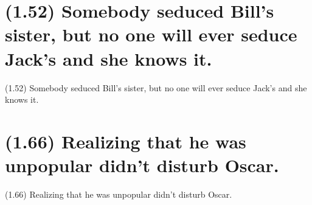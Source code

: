 \documentclass{article}
\begin{document}
\clearpage

%
%

\section*{(1.52) Somebody seduced Bill's sister, but no one will ever seduce Jack’s and she knows it.}

\bigbreak
\begin{enumerate*}
\item[(1.52)] Somebody seduced Bill's sister, but no one will ever seduce Jack’s and she knows it.
\end{enumerate*}
\bigbreak

\bigbreak
\begin{minipage}{\textwidth}
\end{minipage}
\bigbreak

\clearpage

%
%

\section*{(1.66) Realizing that he was unpopular didn't disturb Oscar.}

\bigbreak
\begin{enumerate*}
\item[(1.66)] Realizing that he was unpopular didn't disturb Oscar.
\end{enumerate*}
\bigbreak

\bigbreak
\begin{minipage}{\textwidth}
\end{minipage}
\bigbreak
\end{document}
